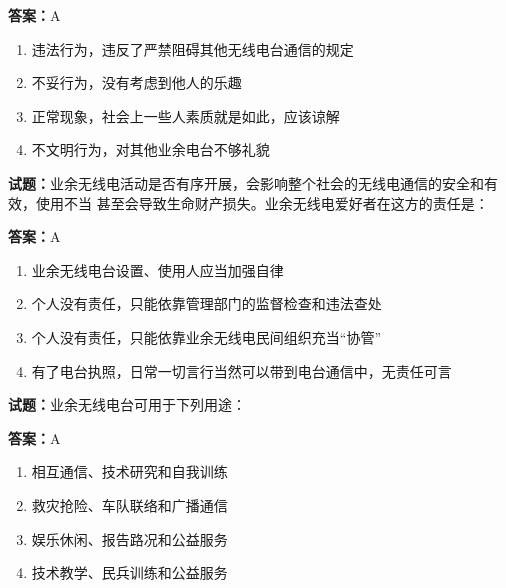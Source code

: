 \documentclass{ctexbook}
\begin{document}
\textbf{答案：}A 

\begin{enumerate}[leftmargin=3em]
  \item 违法行为，违反了严禁阻碍其他无线电台通信的规定 

  \item 不妥行为，没有考虑到他人的乐趣 

  \item 正常现象，社会上一些人素质就是如此，应该谅解 

  \item 不文明行为，对其他业余电台不够礼貌 

\end{enumerate}






\vspace{1em}

\textbf{试题：}业余无线电活动是否有序开展，会影响整个社会的无线电通信的安全和有效，使用不当
甚至会导致生命财产损失。业余无线电爱好者在这方的责任是： 

\textbf{答案：}A 

\begin{enumerate}[leftmargin=3em]
  \item 业余无线电台设置、使用人应当加强自律 

  \item 个人没有责任，只能依靠管理部门的监督检查和违法查处 

  \item 个人没有责任，只能依靠业余无线电民间组织充当“协管” 

  \item 有了电台执照，日常一切言行当然可以带到电台通信中，无责任可言 

\end{enumerate}





\vspace{1em}

\textbf{试题：}业余无线电台可用于下列用途： 

\textbf{答案：}A 

\begin{enumerate}[leftmargin=3em]
  \item 相互通信、技术研究和自我训练 

  \item 救灾抢险、车队联络和广播通信 

  \item 娱乐休闲、报告路况和公益服务 

  \item 技术教学、民兵训练和公益服务 

\end{enumerate}
\end{document}
